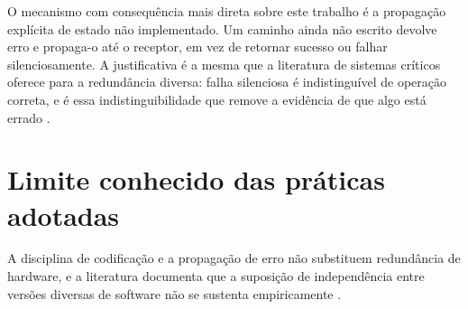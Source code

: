 O mecanismo com consequência mais direta sobre este trabalho é a propagação explícita de
estado não implementado. Um caminho ainda não escrito devolve erro e propaga-o até o
receptor, em vez de retornar sucesso ou falhar silenciosamente. A justificativa é a mesma
que a literatura de sistemas críticos oferece para a redundância diversa: falha silenciosa
é indistinguível de operação correta, e é essa indistinguibilidade que remove a evidência
de que algo está errado \cite{knight1986,esa1996}.

\section{Limite conhecido das práticas adotadas}
\label{sec:ape-limites}

A disciplina de codificação e a propagação de erro não substituem redundância de hardware,
e a literatura documenta que a suposição de independência entre versões diversas de
software não se sustenta empiricamente \cite{knight1986}. 

